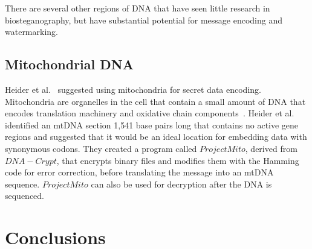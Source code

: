 \documentclass[USenglish,oneside,twocolumn]{article}
\begin{document}
There are several other regions of DNA that have seen little research in biosteganography, but have substantial potential for message encoding and watermarking. 

\subsection{Mitochondrial DNA}

Heider et al.~\cite{HKB2008B} suggested using mitochondria for secret data encoding. Mitochondria are organelles in the cell that contain a small amount of DNA that encodes translation machinery and oxidative chain components~\cite{GV2001G}. Heider et al. identified an mtDNA section 1,541 base pairs long that contains no active gene regions and suggested that it would be an ideal location for embedding data with synonymous codons. They created a program called $Project Mito$, derived from $DNA-Crypt$, that encrypts binary files and modifies them with the Hamming code for error correction, before translating the message into an mtDNA sequence. $Project Mito$ can also be used for decryption after the DNA is sequenced.

\section{Conclusions}



\end{document}
